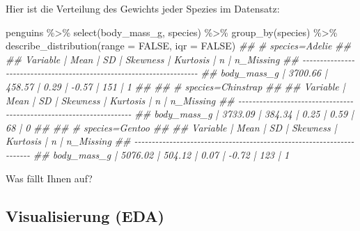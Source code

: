 \documentclass[
  a4paper,
  DIV=11]{scrreprt}
\newenvironment{Shaded}{\begin{snugshade}}{\end{snugshade}}
\newcommand{\AttributeTok}[1]{\textcolor[rgb]{0.40,0.45,0.13}{#1}}
\newcommand{\ConstantTok}[1]{\textcolor[rgb]{0.56,0.35,0.01}{#1}}
\newcommand{\DocumentationTok}[1]{\textcolor[rgb]{0.37,0.37,0.37}{\textit{#1}}}
\newcommand{\FunctionTok}[1]{\textcolor[rgb]{0.28,0.35,0.67}{#1}}
\newcommand{\NormalTok}[1]{\textcolor[rgb]{0.00,0.23,0.31}{#1}}
\newcommand{\SpecialCharTok}[1]{\textcolor[rgb]{0.37,0.37,0.37}{#1}}
\theoremstyle{definition}
\theoremstyle{remark}
\begin{document}
Hier ist die Verteilung des Gewichts jeder Spezies im Datensatz:

\begin{Shaded}
\begin{Highlighting}[]
\NormalTok{penguins }\SpecialCharTok{\%\textgreater{}\%} 
  \FunctionTok{select}\NormalTok{(body\_mass\_g, species) }\SpecialCharTok{\%\textgreater{}\%} 
  \FunctionTok{group\_by}\NormalTok{(species) }\SpecialCharTok{\%\textgreater{}\%} 
  \FunctionTok{describe\_distribution}\NormalTok{(}\AttributeTok{range =} \ConstantTok{FALSE}\NormalTok{, }\AttributeTok{iqr =} \ConstantTok{FALSE}\NormalTok{)}
\DocumentationTok{\#\# \# species=Adelie}
\DocumentationTok{\#\# }
\DocumentationTok{\#\# Variable    |    Mean |     SD | Skewness | Kurtosis |   n | n\_Missing}
\DocumentationTok{\#\# {-}{-}{-}{-}{-}{-}{-}{-}{-}{-}{-}{-}{-}{-}{-}{-}{-}{-}{-}{-}{-}{-}{-}{-}{-}{-}{-}{-}{-}{-}{-}{-}{-}{-}{-}{-}{-}{-}{-}{-}{-}{-}{-}{-}{-}{-}{-}{-}{-}{-}{-}{-}{-}{-}{-}{-}{-}{-}{-}{-}{-}{-}{-}{-}{-}{-}{-}{-}{-}{-}}
\DocumentationTok{\#\# body\_mass\_g | 3700.66 | 458.57 |     0.29 |    {-}0.57 | 151 |         1}
\DocumentationTok{\#\# }
\DocumentationTok{\#\# \# species=Chinstrap}
\DocumentationTok{\#\# }
\DocumentationTok{\#\# Variable    |    Mean |     SD | Skewness | Kurtosis |  n | n\_Missing}
\DocumentationTok{\#\# {-}{-}{-}{-}{-}{-}{-}{-}{-}{-}{-}{-}{-}{-}{-}{-}{-}{-}{-}{-}{-}{-}{-}{-}{-}{-}{-}{-}{-}{-}{-}{-}{-}{-}{-}{-}{-}{-}{-}{-}{-}{-}{-}{-}{-}{-}{-}{-}{-}{-}{-}{-}{-}{-}{-}{-}{-}{-}{-}{-}{-}{-}{-}{-}{-}{-}{-}{-}{-}}
\DocumentationTok{\#\# body\_mass\_g | 3733.09 | 384.34 |     0.25 |     0.59 | 68 |         0}
\DocumentationTok{\#\# }
\DocumentationTok{\#\# \# species=Gentoo}
\DocumentationTok{\#\# }
\DocumentationTok{\#\# Variable    |    Mean |     SD | Skewness | Kurtosis |   n | n\_Missing}
\DocumentationTok{\#\# {-}{-}{-}{-}{-}{-}{-}{-}{-}{-}{-}{-}{-}{-}{-}{-}{-}{-}{-}{-}{-}{-}{-}{-}{-}{-}{-}{-}{-}{-}{-}{-}{-}{-}{-}{-}{-}{-}{-}{-}{-}{-}{-}{-}{-}{-}{-}{-}{-}{-}{-}{-}{-}{-}{-}{-}{-}{-}{-}{-}{-}{-}{-}{-}{-}{-}{-}{-}{-}{-}}
\DocumentationTok{\#\# body\_mass\_g | 5076.02 | 504.12 |     0.07 |    {-}0.72 | 123 |         1}
\end{Highlighting}
\end{Shaded}

Was fällt Ihnen auf?

\hypertarget{visualisierung-eda}{%
\subsection{Visualisierung (EDA)}\label{visualisierung-eda}}
\end{document}

